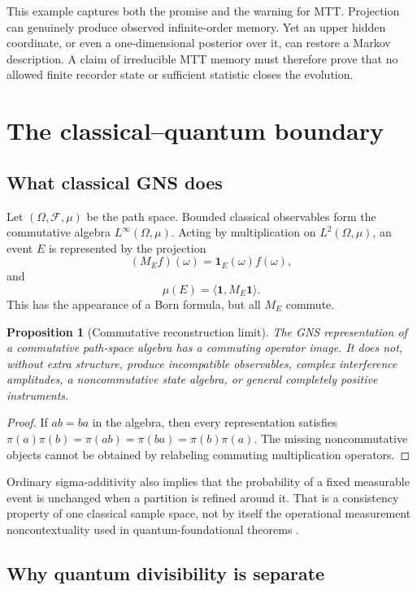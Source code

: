\documentclass[11pt]{article}
\newtheorem{proposition}[theorem]{Proposition}
\theoremstyle{definition}
\theoremstyle{remark}
\newcommand{\cF}{\mathcal{F}}
\begin{document}
This example captures both the promise and the warning for MTT.  Projection
can genuinely produce observed infinite-order memory.  Yet an upper hidden
coordinate, or even a one-dimensional posterior over it, can restore a Markov
description.  A claim of irreducible MTT memory must therefore prove that no
allowed finite recorder state or sufficient statistic closes the evolution.

\section{The classical--quantum boundary}

\subsection{What classical GNS does}

Let \((\Omega,\cF,\mu)\) be the path space.  Bounded classical observables form
the commutative algebra \(L^\infty(\Omega,\mu)\).  Acting by multiplication on
\(L^2(\Omega,\mu)\), an event \(E\) is represented by the projection
\[
(M_Ef)(\omega)=\mathbf{1}_E(\omega)f(\omega),
\]
and
\[
\mu(E)=\langle \mathbf{1},M_E\mathbf{1}\rangle.
\]
This has the appearance of a Born formula, but all \(M_E\) commute.

\begin{proposition}[Commutative reconstruction limit]\label{prop:commutative}
The GNS representation of a commutative path-space algebra has a commuting
operator image.  It does not, without extra structure, produce incompatible
observables, complex interference amplitudes, a noncommutative state algebra,
or general completely positive instruments.
\end{proposition}

\begin{proof}
If \(ab=ba\) in the algebra, then every representation satisfies
\(\pi(a)\pi(b)=\pi(ab)=\pi(ba)=\pi(b)\pi(a)\).  The missing noncommutative
objects cannot be obtained by relabeling commuting multiplication operators.
\end{proof}

Ordinary sigma-additivity also implies that the probability of a fixed
measurable event is unchanged when a partition is refined around it.  That is
a consistency property of one classical sample space, not by itself the
operational measurement noncontextuality used in quantum-foundational
theorems \cite{spekkens2005}.

\subsection{Why quantum divisibility is separate}
\end{document}
